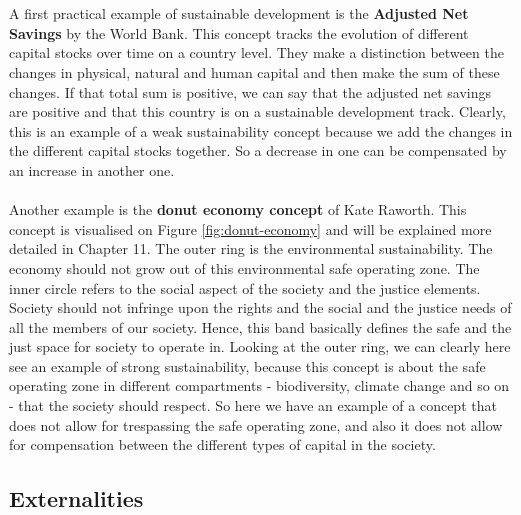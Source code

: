 \documentclass[../summary.tex]{subfiles}
\begin{document}
	 \\\\
	 A first practical example of sustainable development is the \textbf{Adjusted Net Savings} by the World Bank. This concept tracks the evolution of different capital stocks over time on a country level. They make a distinction between the changes in physical, natural and human capital and then make the sum of these changes. If that total sum is positive, we can say that the adjusted net savings are positive and that this country is on a sustainable development track. Clearly, this is an example of a weak sustainability concept because we add the changes in the different capital stocks together. So a decrease in one can be compensated by an increase in another one.
	 \\\\
	 Another example is the \textbf{donut economy concept} of Kate Raworth. This concept is visualised on Figure \ref{fig:donut-economy} and will be explained more detailed in Chapter 11. The outer ring is the environmental sustainability. The economy should not grow out of this environmental safe operating zone. The inner circle refers to the social aspect of the society and the justice elements. Society should not infringe upon the rights and the social and the justice needs of all the members of our society. Hence, this band basically defines the safe and the just space for society to operate in. Looking at the outer ring, we can clearly here see an example of strong sustainability, because this concept is about the safe operating zone in different compartments - biodiversity, climate change and so on - that the society should respect. So here we have an example of a concept that does not allow for trespassing the safe operating zone, and also it does not allow for compensation between the different types of capital in the society. 
	 
	 \subsection{Externalities}
	 
\end{document}
